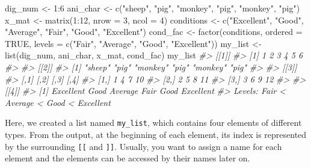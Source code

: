 \documentclass[
]{book}
\newenvironment{Shaded}{\begin{snugshade}}{\end{snugshade}}
\newcommand{\AttributeTok}[1]{\textcolor[rgb]{0.77,0.63,0.00}{#1}}
\newcommand{\CommentTok}[1]{\textcolor[rgb]{0.56,0.35,0.01}{\textit{#1}}}
\newcommand{\ConstantTok}[1]{\textcolor[rgb]{0.00,0.00,0.00}{#1}}
\newcommand{\DecValTok}[1]{\textcolor[rgb]{0.00,0.00,0.81}{#1}}
\newcommand{\FunctionTok}[1]{\textcolor[rgb]{0.00,0.00,0.00}{#1}}
\newcommand{\NormalTok}[1]{#1}
\newcommand{\OtherTok}[1]{\textcolor[rgb]{0.56,0.35,0.01}{#1}}
\newcommand{\SpecialCharTok}[1]{\textcolor[rgb]{0.00,0.00,0.00}{#1}}
\newcommand{\StringTok}[1]{\textcolor[rgb]{0.31,0.60,0.02}{#1}}
\begin{document}
\begin{Shaded}
\begin{Highlighting}[]
\NormalTok{dig\_num }\OtherTok{\textless{}{-}} \DecValTok{1}\SpecialCharTok{:}\DecValTok{6}
\NormalTok{ani\_char }\OtherTok{\textless{}{-}} \FunctionTok{c}\NormalTok{(}\StringTok{"sheep"}\NormalTok{, }\StringTok{"pig"}\NormalTok{, }\StringTok{"monkey"}\NormalTok{, }\StringTok{"pig"}\NormalTok{, }\StringTok{"monkey"}\NormalTok{, }\StringTok{"pig"}\NormalTok{)}
\NormalTok{x\_mat }\OtherTok{\textless{}{-}} \FunctionTok{matrix}\NormalTok{(}\DecValTok{1}\SpecialCharTok{:}\DecValTok{12}\NormalTok{, }\AttributeTok{nrow =} \DecValTok{3}\NormalTok{, }\AttributeTok{ncol =} \DecValTok{4}\NormalTok{)}
\NormalTok{conditions }\OtherTok{\textless{}{-}} \FunctionTok{c}\NormalTok{(}\StringTok{"Excellent"}\NormalTok{, }\StringTok{"Good"}\NormalTok{, }\StringTok{"Average"}\NormalTok{, }\StringTok{"Fair"}\NormalTok{, }\StringTok{"Good"}\NormalTok{, }\StringTok{"Excellent"}\NormalTok{)}
\NormalTok{cond\_fac }\OtherTok{\textless{}{-}} \FunctionTok{factor}\NormalTok{(conditions, }\AttributeTok{ordered =} \ConstantTok{TRUE}\NormalTok{, }\AttributeTok{levels =} \FunctionTok{c}\NormalTok{(}\StringTok{"Fair"}\NormalTok{, }\StringTok{"Average"}\NormalTok{, }\StringTok{"Good"}\NormalTok{, }\StringTok{"Excellent"}\NormalTok{))}
\NormalTok{my\_list }\OtherTok{\textless{}{-}} \FunctionTok{list}\NormalTok{(dig\_num, ani\_char, x\_mat, cond\_fac)}
\NormalTok{my\_list}
\CommentTok{\#\textgreater{} [[1]]}
\CommentTok{\#\textgreater{} [1] 1 2 3 4 5 6}
\CommentTok{\#\textgreater{} }
\CommentTok{\#\textgreater{} [[2]]}
\CommentTok{\#\textgreater{} [1] "sheep"  "pig"    "monkey" "pig"    "monkey" "pig"   }
\CommentTok{\#\textgreater{} }
\CommentTok{\#\textgreater{} [[3]]}
\CommentTok{\#\textgreater{}      [,1] [,2] [,3] [,4]}
\CommentTok{\#\textgreater{} [1,]    1    4    7   10}
\CommentTok{\#\textgreater{} [2,]    2    5    8   11}
\CommentTok{\#\textgreater{} [3,]    3    6    9   12}
\CommentTok{\#\textgreater{} }
\CommentTok{\#\textgreater{} [[4]]}
\CommentTok{\#\textgreater{} [1] Excellent Good      Average   Fair      Good      Excellent}
\CommentTok{\#\textgreater{} Levels: Fair \textless{} Average \textless{} Good \textless{} Excellent}
\end{Highlighting}
\end{Shaded}

Here, we created a list named \texttt{my\_list}, which contains four elements of different types. From the output, at the beginning of each element, its index is represented by the surrounding \texttt{{[}{[}} and \texttt{{]}{]}}. Usually, you want to assign a name for each element and the elements can be accessed by their names later on.
\end{document}
